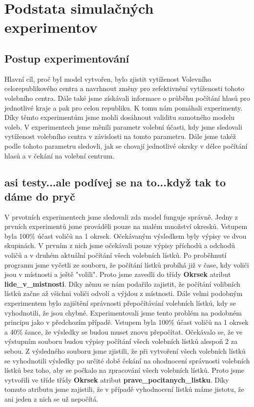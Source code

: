 \documentclass[12pt,a4paper,titlepage,final]{article}
\begin{document}
\newpage


\section{Podstata simulačných experimentov}
\subsection{Postup experimentování}
Hlavní cíl, proč byl model vytvořen, bylo zjistit vytíženost Volevního celorepublikového centra a navrhnout změny pro zefektivnění vytíženosti tohoto volebního centra. Dále také jsme získávali informace o průběhu počítání hlasů pro jednotlivé kraje a pak pro celou republiku. K tomu nám pomáhali experimenty. Díky těmto experimentům jsme mohli dosáhnout validitu samotného modelu voleb. V experimentech jsme měnili parametr volební účasti, kdy jsme sledovali vytíženost volebního centra v závislosti na tomto parametru. Dále jsme takéž podle tohoto parametru sledovli, jak se chovají jednotlivé okrsky v délce počítání hlasů a v čekání na volební centrum. 
\subsection{asi testy...ale podívej se na to...když tak to dáme do pryč}
V prvotních experimentech jsme sledovali zda model funguje správně. Jedny z prvních experimentů jsme prováděli pouze na malém množství okresků. Vstupem byla 100\% účast voličů na 1 okrsek. Očekávaným výsledkem byly výpisy ve dvou skupinách. V prvním z nich jsme očekávali pouze výpisy příchodů a odchodů voličů a v druhém aktuální počítání všech volebních lístků. Po proběhnutí programu jsme vyčetli ze souboru, že počítání lístků probíhá již v čase, kdy voliči jsou v místnosti a ještě "volili". Proto jsme zavedli do třídy \textbf{Okrsek} atribut \textbf{lide\_v\_mistnosti}. Díky němu se nám podařilo zajistit, že počítání volibních lístků začne až všichni voliči odvolí a výjdou z místnosti. 
Dále velmi podobným experimentem bylo zajištění správnosti přepočítávání volebních lístků, kdy se vyhodnotili, že jsou chybné. Experimentovali jsme tento problém na podobném principu jako v předchozím případě. Vstupem byla 100\% účast voličů na 1 okrsek a 40\% šance, že výsledky se budou muset znovu přepočítat. Očekávalo se, že ve výstupním souboru budou výpisy počítání všech volebních lístků alespoň 2 za sebou. Z výsledného souboru jsme zjistili, že při vytvoření všech volebních lístků se vyhodnotili výsledky po určité době čekání na ohodnocení správnosti volebních lístků bez toho, aby se počkalo na zpracování všech volebních lístků. Proto jsme vytvořili ve tříde třídy \textbf{Okrsek} atribut \textbf{prave\_pocitanych\_listku}. Díky tomuto atributu jsme zajistili, že v případě vyhodnocení lístků máme jistotu, že ani jeden z nich se už nepočítá. 
\end{document}
